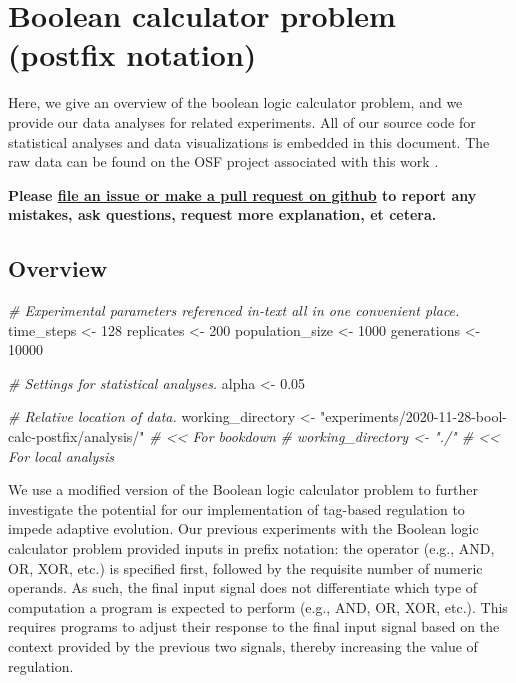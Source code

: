 \documentclass[
]{book}
\newenvironment{Shaded}{\begin{snugshade}}{\end{snugshade}}
\newcommand{\CommentTok}[1]{\textcolor[rgb]{0.56,0.35,0.01}{\textit{#1}}}
\newcommand{\DecValTok}[1]{\textcolor[rgb]{0.00,0.00,0.81}{#1}}
\newcommand{\FloatTok}[1]{\textcolor[rgb]{0.00,0.00,0.81}{#1}}
\newcommand{\NormalTok}[1]{#1}
\newcommand{\StringTok}[1]{\textcolor[rgb]{0.31,0.60,0.02}{#1}}
\begin{document}
\hypertarget{boolean-calculator-problem-postfix-notation}{%
\chapter{Boolean calculator problem (postfix notation)}\label{boolean-calculator-problem-postfix-notation}}

Here, we give an overview of the boolean logic calculator problem, and we provide our data analyses for related experiments.
All of our source code for statistical analyses and data visualizations is embedded in this document.
The raw data can be found on the OSF project associated with this work \citep{Lalejini_Moreno_Ofria_Data_2020}.

\textbf{Please \href{https://github.com/amlalejini/Tag-based-Genetic-Regulation-for-LinearGP/issues}{file an issue or make a pull request on github} to report any mistakes, ask questions, request more explanation, et cetera.}

\hypertarget{overview-4}{%
\section{Overview}\label{overview-4}}

\begin{Shaded}
\begin{Highlighting}[]
\CommentTok{\# Experimental parameters referenced in{-}text all in one convenient place.}
\NormalTok{time\_steps \textless{}{-}}\StringTok{ }\DecValTok{128}
\NormalTok{replicates \textless{}{-}}\StringTok{ }\DecValTok{200}
\NormalTok{population\_size \textless{}{-}}\StringTok{ }\DecValTok{1000}
\NormalTok{generations \textless{}{-}}\StringTok{ }\DecValTok{10000}

\CommentTok{\# Settings for statistical analyses.}
\NormalTok{alpha \textless{}{-}}\StringTok{ }\FloatTok{0.05}

\CommentTok{\# Relative location of data.}
\NormalTok{working\_directory \textless{}{-}}\StringTok{ "experiments/2020{-}11{-}28{-}bool{-}calc{-}postfix/analysis/"} \CommentTok{\# \textless{}\textless{} For bookdown}
\CommentTok{\# working\_directory \textless{}{-} "./"                                              \# \textless{}\textless{} For local analysis}
\end{Highlighting}
\end{Shaded}

We use a modified version of the Boolean logic calculator problem to further investigate the potential for our implementation of tag-based regulation to impede adaptive evolution.
Our previous experiments with the Boolean logic calculator problem provided inputs in prefix notation: the operator (e.g., AND, OR, XOR, etc.) is specified first, followed by the requisite number of numeric operands.
As such, the final input signal does not differentiate which type of computation a program is expected to perform (e.g., AND, OR, XOR, etc.).
This requires programs to adjust their response to the final input signal based on the context provided by the previous two signals, thereby increasing the value of regulation.
\end{document}
